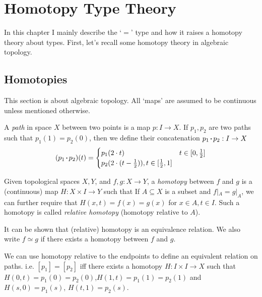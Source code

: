 \chapter{Homotopy Type Theory}
\label{HoTT}

In this chapter I mainly describe the `$=$' type and how it raises
a homotopy theory about types. First, let's recall some homotopy theory
in algebraic topology.

\section{Homotopies}

This section is about algebraic topology. All `maps' are assumed to be
continuous unless mentioned otherwise. 

\newcommand{\sqcdot}{\mathbin{\vcenter{\hbox{\rule{.3ex}{.3ex}}}}}
\newcommand{\concat}{\sqcdot}

\begin{definition}
    \label{path}
    A {\it path} in space $X$ between two points is a map $p: I\to X$.
    If $p_1,p_2$ are two paths such that $p_1(1)=p_2(0)$, then we
    define their concatenation $p_1\concat p_2: I\to X$
    $$
        (p_1\concat p_2)(t) = \begin{cases}
            p_1(2\cdot t) & t\in[0,\frac{1}{2}] \\
            p_2(2\cdot(t-\frac{1}{2})), t\in[\frac{1}{2}, 1]
        \end{cases}
    $$
\end{definition}

\begin{definition}
    \label{homotopy}
    Given topological spaces $X,Y$, and $f,g:X\to Y$, a {\it homotopy} between
    $f$ and $g$ is a (continuous) map $H:X\times I\to Y$ such that
    If $A\subseteq X$ is a subset and $f|_A=g|_A$, we can further require
    that $H(x, t)=f(x)=g(x)$ for $x\in A,t\in I$. Such a homotopy is called
    {\it relative homotopy} (homotopy relative to $A$). 

    It can be shown that (relative) homotopy is an equivalence relation.
    We also write $f\simeq g$ if there exists a homotopy between $f$ and
    $g$. 
\end{definition}

We can use homotopy relative to the endpoints to define an equivalent
relation on paths. i.e. $[p_1]=[p_2]$ iff there exists a homotopy 
$H: I\times I\to X$ such that $H(0, t)=p_1(0)=p_2(0)$,$
H(1,t)=p_1(1)=p_2(1)$ and $H(s,0)=p_1(s)$, $H(t,1)=p_2(s)$.

